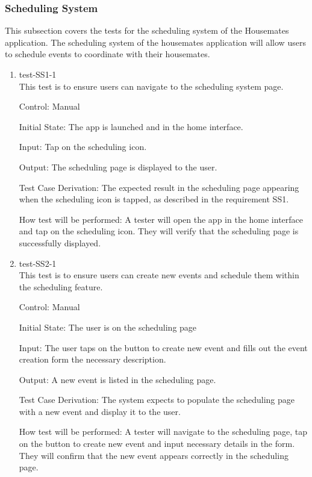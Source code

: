 \documentclass[12pt, titlepage]{article}
\begin{document}
\subsubsection{Scheduling  System}

This subsection covers the tests for the scheduling system of the Housemates application. The scheduling system of the housemates application will allow users to schedule events to coordinate with their housemates.

\begin{enumerate}

\item{test-SS1-1\\}
This test is to ensure users can navigate to the scheduling system page.

Control: Manual
					
Initial State: The app is launched and in the home interface.
					
Input: Tap on the scheduling icon.
					
Output: The scheduling page is displayed to the user.

Test Case Derivation: The expected result in the scheduling page appearing when the scheduling icon is tapped, as described in the requirement SS1.
					
How test will be performed: A tester will open the app in the home interface and tap on the scheduling icon. They will verify that the scheduling page is successfully displayed.


\item{test-SS2-1\\}
This test is to ensure users can create new events and schedule them within the scheduling feature.

Control: Manual
					
Initial State: The user is on the scheduling page
					
Input: The user taps on the button to create new event and fills out the event creation form the necessary description.
					
Output: A new event is listed in the scheduling page.

Test Case Derivation: The system expects to populate the scheduling page with a new event and display it to the user. 

How test will be performed: A tester will navigate to the scheduling page, tap on the button to create new event and input necessary details in the form. They will confirm that the new event appears correctly in the scheduling page.


\end{enumerate}
\end{document}
